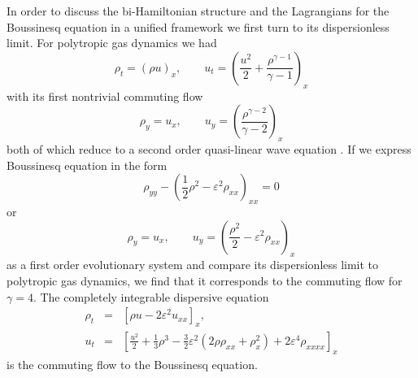 \documentclass[a4paper,12pt]{article}
\begin{document}
In order to discuss the bi-Hamiltonian structure and the
Lagrangians for the Boussinesq equation in a unified framework we
first turn to its dispersionless limit. For polytropic gas
dynamics we had
\begin{equation}
\rho _{t} = (\rho u)_{x}, \qquad u_{t} =
\left(\frac{u^{2}}{2}+\frac{\rho ^{\gamma -1}}{\gamma
-1}\right)_{x}
\end{equation}
with its first nontrivial commuting flow
\begin{equation}
\rho_{y} = u_{x}, \qquad u_{y} = \left(\frac{\rho ^{\gamma
-2}}{\gamma -2}\right)_{x}
\end{equation}
both of which reduce to a second order quasi-linear wave equation
\cite{gn1}. If we express Boussinesq equation in the form
\begin{equation}
\rho_{yy} -  \left( \frac{1}{2} \rho^2  - \varepsilon^2 \rho_{xx}
\right)_{xx} = 0 \label{boussinesq}
\end{equation}
or
\begin{equation}
\rho_{y}=u_{x}, \qquad u_{y}= \left(\frac{\rho ^{2}}{2} -
\varepsilon^2 \rho_{xx}\right)_x \label{b1}
\end{equation}
as a first order evolutionary system and compare its
dispersionless limit to polytropic gas dynamics, we find that it
corresponds to the commuting flow for $\gamma =4$. The completely
integrable dispersive equation
\begin{eqnarray}
\rho _{t} & = &  \left[\rho u-2\varepsilon ^{2}u_{xx} \right]_{x},
\label{commb} \\
u_{t}& = & \left[\frac{u^{2}}{2}+\frac{1}{3}\rho ^{3}-\frac{3}{2}
\varepsilon ^{2}(2\rho \rho _{xx}+\rho _{x}^{2})+2\varepsilon
^{4}\rho_{xxxx}\right]_{x} \nonumber
\end{eqnarray}
is the commuting flow to the Boussinesq equation.
\end{document}
